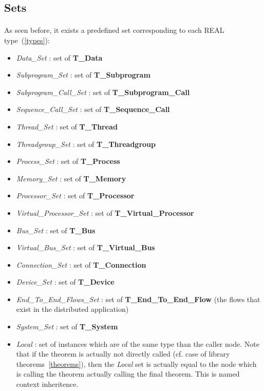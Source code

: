 \subsection {Sets}
\label {predefined_sets}

\paragraph{}
As seen before, it exists a predefined set corresponding to each REAL type~(\ref{types}):
\begin {itemize}
\item \textit{Data\_Set} : set of \textbf{T\_Data}
\item \textit{Subprogram\_Set} : set of \textbf{T\_Subprogram}
\item \textit{Subprogram\_Call\_Set} : set of \textbf{T\_Subprogram\_Call}
\item \textit{Sequence\_Call\_Set} : set of \textbf{T\_Sequence\_Call}
\item \textit{Thread\_Set} : set of \textbf{T\_Thread}
\item \textit{Threadgroup\_Set} : set of \textbf{T\_Threadgroup}
\item \textit{Process\_Set} : set of \textbf{T\_Process}
\item \textit{Memory\_Set} : set of \textbf{T\_Memory}
\item \textit{Processor\_Set} : set of \textbf{T\_Processor}
\item \textit{Virtual\_Processor\_Set} : set of \textbf{T\_Virtual\_Processor}
\item \textit{Bus\_Set} : set of \textbf{T\_Bus}
\item \textit{Virtual\_Bus\_Set} : set of \textbf{T\_Virtual\_Bus}
\item \textit{Connection\_Set} : set of \textbf{T\_Connection}
\item \textit{Device\_Set} : set of \textbf{T\_Device}
\item \textit{End\_To\_End\_Flows\_Set} : set of \textbf{T\_End\_To\_End\_Flow} (the flows that exist in the distributed application)
\item \textit{System\_Set} : set of \textbf{T\_System}
\item \textit{Local} : set of instances which are of the same type than 
the caller node. Note that if the theorem is actually not directly called (cf. case of library theorems~\ref {theorems}), then the \textit{Local} set is actually equal to the node which is calling the theorem actually calling the final theorem. This is named context inheritence.
\end {itemize}

